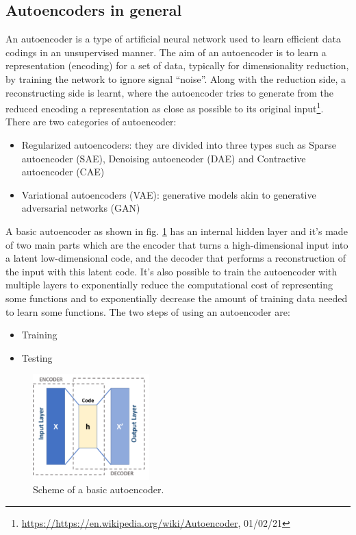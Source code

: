 \subsection{Autoencoders in general}
An autoencoder is a type of artificial neural network used to learn efficient data codings in an unsupervised manner. The aim of an autoencoder is to learn a representation (encoding) for a set of data, typically for dimensionality reduction, by training the network to ignore signal “noise”. Along with the reduction side, a reconstructing side is learnt, where the autoencoder tries to generate from the reduced encoding a representation as close as possible to its original input\footnote{\url{https://https://en.wikipedia.org/wiki/Autoencoder}, 01/02/21}.
There are two categories of autoencoder:
\begin{itemize}
\item Regularized autoencoders: they are divided into three types such as Sparse autoencoder (SAE), Denoising autoencoder (DAE) and Contractive autoencoder (CAE)
\item Variational autoencoders (VAE): generative models akin to generative adversarial networks (GAN)
\end{itemize}
A basic autoencoder as shown in fig. \ref{fig:autoencoder}  has an internal hidden layer and it's made of two main parts which are the encoder that turns a high-dimensional input into a latent low-dimensional code, and the decoder that performs a reconstruction of the input with this latent code. It's also possible to train the autoencoder with multiple layers to exponentially reduce the computational cost of representing some functions and to exponentially decrease the amount of training data needed to learn some functions. 
The two steps of using an autoencoder are:
\begin{itemize}
\item Training
\item Testing
\end{itemize}
\begin{figure}[h!]
    \centering
    \includegraphics[width=0.4\textwidth]{images/autoencoder.png}
    \caption{Scheme of a basic autoencoder.}
    \label{fig:autoencoder}    
\end{figure}

